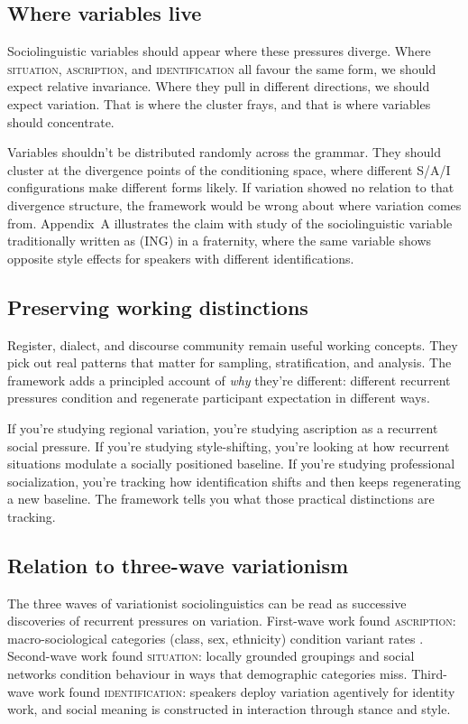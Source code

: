 \documentclass[11pt,letterpaper]{article}
\begin{document}
\subsection{Where variables live}

Sociolinguistic variables should appear where these pressures diverge. Where \textsc{situation}, \textsc{ascription}, and \textsc{identification} all favour the same form, we should expect relative invariance. Where they pull in different directions, we should expect variation. That is where the cluster frays, and that is where variables should concentrate.

Variables shouldn't be distributed randomly across the grammar. They should cluster at the divergence points of the conditioning space, where different S/A/I configurations make different forms likely. If variation showed no relation to that divergence structure, the framework would be wrong about where variation comes from. Appendix~A illustrates the claim with  study of the sociolinguistic variable traditionally written as (ING) in a fraternity, where the same variable shows opposite style effects for speakers with different identifications.

\subsection{Preserving working distinctions}

Register, dialect, and discourse community remain useful working concepts. They pick out real patterns that matter for sampling, stratification, and analysis. The framework adds a principled account of \emph{why} they're different: different recurrent pressures condition and regenerate participant expectation in different ways.

If you're studying regional variation, you're studying ascription as a recurrent social pressure. If you're studying style-shifting, you're looking at how recurrent situations modulate a socially positioned baseline. If you're studying professional socialization, you're tracking how identification shifts and then keeps regenerating a new baseline. The framework tells you what those practical distinctions are tracking.

\subsection{Relation to three-wave variationism}

The three waves of variationist sociolinguistics can be read as successive discoveries of recurrent pressures on variation. First-wave work found \textsc{ascription}: macro-sociological categories (class, sex, ethnicity) condition variant rates \citep{drummond_schleef2016_identity}. Second-wave work found \textsc{situation}: locally grounded groupings and social networks condition behaviour in ways that demographic categories miss. Third-wave work found \textsc{identification}: speakers deploy variation agentively for identity work, and social meaning is constructed in interaction through stance and style.
\end{document}
